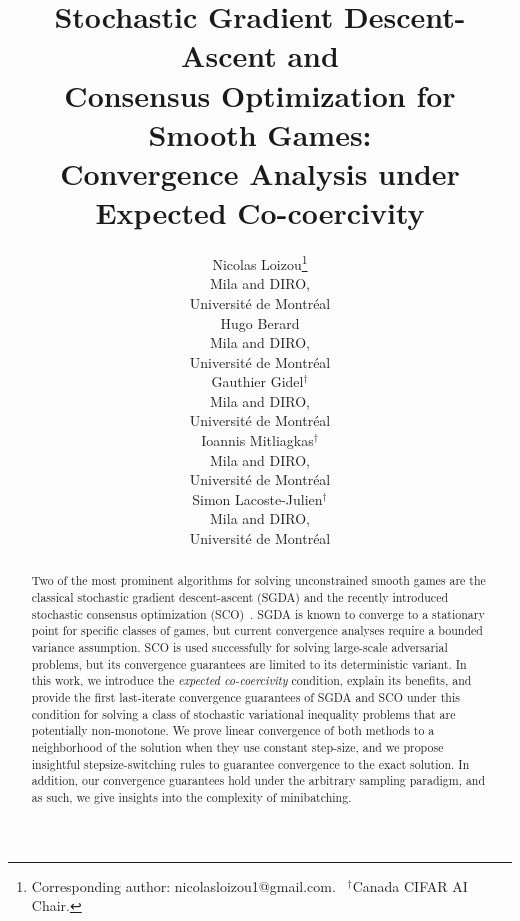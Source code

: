 \documentclass{article}
\title{Stochastic Gradient Descent-Ascent and \\ Consensus Optimization for Smooth Games: \\Convergence Analysis under Expected Co-coercivity}
\author{%
  Nicolas Loizou\thanks{Corresponding author: nicolasloizou1@gmail.com. \, $^\dagger$Canada CIFAR AI Chair.} \\
  Mila and DIRO,\\
   Universit\'{e} de Montr\'{e}al\\
  \And
   Hugo Berard \\
   Mila and DIRO,\\
   Universit\'{e} de Montr\'{e}al\\
   \And
      Gauthier Gidel$^\dagger$ \\
   Mila and DIRO,\\
   Universit\'{e} de Montr\'{e}al\\
   \And
  Ioannis Mitliagkas$^\dagger$ \\
   Mila and DIRO,\\
   Universit\'{e} de Montr\'{e}al\\
   \And
   Simon Lacoste-Julien$^\dagger$ \\
   Mila and DIRO,\\
   Universit\'{e} de Montr\'{e}al\\
}
\begin{document}
\maketitle
\begin{abstract}
Two of the most prominent algorithms for solving unconstrained smooth games are the classical stochastic gradient descent-ascent (SGDA) and the recently introduced stochastic consensus optimization (SCO)~\citep{mescheder2017numerics}.
SGDA is known to converge to a stationary point for specific classes of games, but current convergence analyses require a bounded variance assumption. SCO is used successfully for solving large-scale adversarial problems, but its convergence guarantees are limited to its deterministic variant. In this work, we introduce the \textit{expected co-coercivity} condition, explain its benefits, and provide the first last-iterate convergence guarantees of SGDA and SCO under this condition for solving a class of stochastic variational inequality problems that are potentially non-monotone. We prove linear convergence of both methods to a neighborhood of the solution when they use constant step-size, and we propose insightful stepsize-switching rules to
guarantee convergence to the exact solution. In addition, our convergence guarantees hold under the arbitrary sampling paradigm, and as such, we give insights into the complexity of minibatching. 
\end{abstract}
\end{document}
